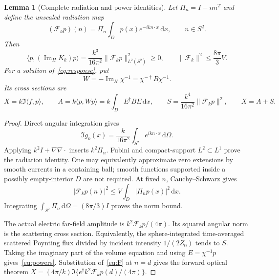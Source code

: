 \documentclass[11pt]{article}
\newtheorem{lemma}[theorem]{Lemma}
\newcommand{\ImH}{\operatorname{Im}_{\!H}}
\newcommand{\dd}{\,\mathrm{d}}
\newcommand{\ip}[2]{\langle #1,#2\rangle}
\newcommand{\norm}[1]{\lVert #1\rVert}
\newcommand{\abs}[1]{\lvert #1\rvert}
\begin{document}
\begin{lemma}[Complete radiation and power identities]\label{lem:radiation}
Let $\Pi_n=I-nn^T$ and define the unscaled radiation map
\begin{equation}\label{eq:F}
 (\mathcal F_kp)(n)=\Pi_n\int_Dp(x)e^{-ikn\cdot x}\dd x,
 \qquad n\in S^2.
\end{equation}
Then
\begin{equation}\label{eq:radiation}
 \ip{p}{(\ImH K_k)p}=\frac{k^3}{16\pi^2}
 \norm{\mathcal F_kp}_{L^2(S^2)}^2\geq0,
 \qquad \norm{\mathcal F_k}^2\leq\frac{8\pi}{3}V.
\end{equation}
For a solution of~\eqref{eq:response}, put
\begin{equation}\label{eq:W}
 W=-\ImH\chi^{-1}=\chi^{-\dagger}B\chi^{-1}.
\end{equation}
Its cross sections are
\begin{equation}\label{eq:powers}
 X=k\Im\ip{f}{p},\qquad A=k\ip{p}{Wp}
     =k\int_DE^\dagger BE\dd x,\qquad
 S=\frac{k^4}{16\pi^2}\norm{\mathcal F_kp}^2,
 \qquad X=A+S.
\end{equation}
\end{lemma}
\begin{proof}
Direct angular integration gives
\[
 \Im g_k(x)=\frac{k}{16\pi^2}\int_{S^2}e^{ikn\cdot x}\dd\Omega.
\]
Applying $k^2I+\nabla\nabla\cdot$ inserts $k^2\Pi_n$. Fubini and compact-support $L^2\subset L^1$ prove the radiation identity. One may equivalently approximate zero extensions by smooth currents in a containing ball; smooth functions supported inside a possibly empty-interior $D$ are not required. At fixed $n$, Cauchy--Schwarz gives
\[
 \abs{\mathcal F_kp(n)}^2\leq V\int_D\abs{\Pi_np(x)}^2\dd x.
\]
Integrating $\int_{S^2}\Pi_n\dd\Omega=(8\pi/3)I$ proves the norm bound.

The actual electric far-field amplitude is $k^2\mathcal F_kp/(4\pi)$. Its squared angular norm is the scattering cross section. Equivalently, the sphere-integrated time-averaged scattered Poynting flux divided by incident intensity $1/(2Z_0)$ tends to $S$. Taking the imaginary part of the volume equation and using $E=\chi^{-1}p$ gives~\eqref{eq:powers}. Substitution of~\eqref{eq:F} at $n=d$ gives the forward optical theorem $X=(4\pi/k)\Im\{e^\dagger k^2\mathcal F_kp(d)/(4\pi)\}$.
\end{proof}
\end{document}
